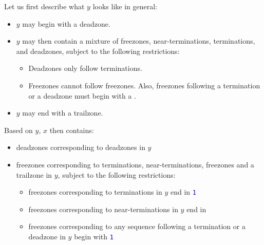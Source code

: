 \noindent Let us first describe what $y$ looks like in general:
\begin{itemize}
  \item $y$ may begin with a deadzone.
  \item $y$ may then contain a mixture of freezones, near-terminations, terminations, and deadzones, subject to the following restrictions:
    \begin{itemize}
      \item Deadzones only follow terminations.
      \item Freezones cannot follow freezones. Also, freezones following a termination or a deadzone must begin with a \texttt{}.
    \end{itemize}
  \item $y$ may end with a trailzone.
\end{itemize}
Based on $y$, $x$ then contains:
\begin{itemize}
  \item deadzones corresponding to deadzones in $y$
  \item freezones corresponding to terminations, near-terminations, freezones and a trailzone in $y$, subject to the following restrictions:
    \begin{itemize}
      \item freezones corresponding to terminations in $y$ end in \texttt{\textcolor{blue}{1}}
      \item freezones corresponding to near-terminations in $y$ end in \texttt{}
      \item freezones corresponding to any sequence following a termination or a deadzone in $y$ begin with \texttt{\textcolor{blue}{1}}
    \end{itemize}
\end{itemize}

